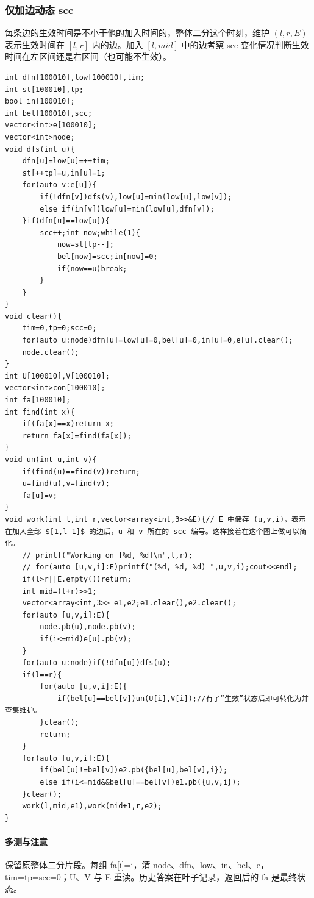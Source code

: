\subsubsection{仅加边动态 scc}
每条边的生效时间是不小于他的加入时间的，整体二分这个时刻，维护 $(l,r,E)$ 表示生效时间在 $[l,r]$ 内的边。加入 $[l,mid]$ 中的边考察 scc 变化情况判断生效时间在左区间还是右区间（也可能不生效）。

\begin{lstlisting}
int dfn[100010],low[100010],tim;
int st[100010],tp;
bool in[100010];
int bel[100010],scc;
vector<int>e[100010];
vector<int>node;
void dfs(int u){
    dfn[u]=low[u]=++tim;
    st[++tp]=u,in[u]=1;
    for(auto v:e[u]){
        if(!dfn[v])dfs(v),low[u]=min(low[u],low[v]);
        else if(in[v])low[u]=min(low[u],dfn[v]);
    }if(dfn[u]==low[u]){
        scc++;int now;while(1){
            now=st[tp--];
            bel[now]=scc;in[now]=0;
            if(now==u)break;
        }
    }
}
void clear(){
    tim=0,tp=0;scc=0;
    for(auto u:node)dfn[u]=low[u]=0,bel[u]=0,in[u]=0,e[u].clear();
    node.clear();
}
int U[100010],V[100010];
vector<int>con[100010];
int fa[100010];
int find(int x){
    if(fa[x]==x)return x;
    return fa[x]=find(fa[x]);
}
void un(int u,int v){
    if(find(u)==find(v))return;
    u=find(u),v=find(v);
    fa[u]=v;
}
void work(int l,int r,vector<array<int,3>>&E){// E 中储存 (u,v,i)，表示在加入全部 $[1,l-1]$ 的边后，u 和 v 所在的 scc 编号。这样接着在这个图上做可以简化。
    // printf("Working on [%d, %d]\n",l,r);
    // for(auto [u,v,i]:E)printf("(%d, %d, %d) ",u,v,i);cout<<endl;
    if(l>r||E.empty())return;
    int mid=(l+r)>>1;
    vector<array<int,3>> e1,e2;e1.clear(),e2.clear();
    for(auto [u,v,i]:E){
        node.pb(u),node.pb(v);
        if(i<=mid)e[u].pb(v);
    }
    for(auto u:node)if(!dfn[u])dfs(u);
    if(l==r){
        for(auto [u,v,i]:E){
            if(bel[u]==bel[v])un(U[i],V[i]);//有了“生效”状态后即可转化为并查集维护。
        }clear();
        return;
    }
    for(auto [u,v,i]:E){
        if(bel[u]!=bel[v])e2.pb({bel[u],bel[v],i});
        else if(i<=mid&&bel[u]==bel[v])e1.pb({u,v,i});
    }clear();
    work(l,mid,e1),work(mid+1,r,e2);
}
\end{lstlisting}

\paragraph{多测与注意} 保留原整体二分片段。每组 fa[i]=i，清 node、dfn、low、in、bel、e，tim=tp=scc=0；U、V 与 E 重读。历史答案在叶子记录，返回后的 fa 是最终状态。
